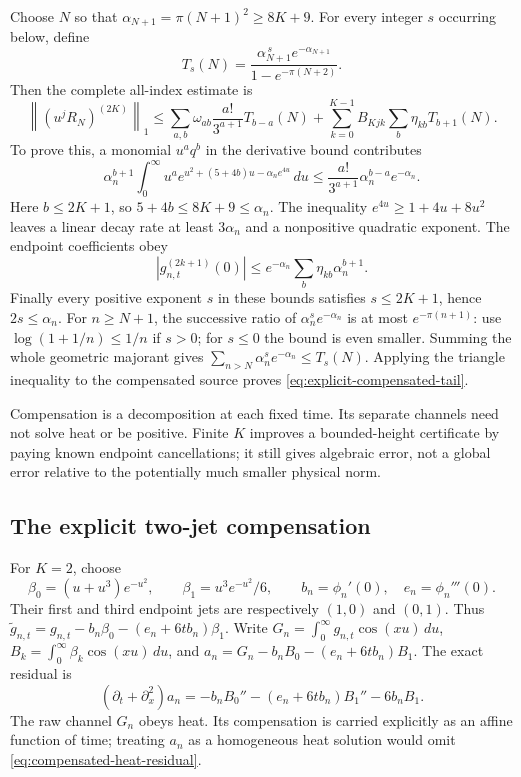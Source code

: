 \documentclass[11pt]{article}
\numberwithin{equation}{section}
\theoremstyle{definition}
\theoremstyle{remark}
\begin{document}
Choose \(N\) so that
\(\alpha_{N+1}=\pi(N+1)^2\geq8K+9\).
For every integer \(s\) occurring below, define
\[
 T_s(N)=
 \frac{\alpha_{N+1}^{\,s}e^{-\alpha_{N+1}}}
 {1-e^{-\pi(N+2)}}.
\]
Then the complete all-index estimate is
\begin{equation}
 \left\|(u^jR_N)^{(2K)}\right\|_1
 \leq
 \sum_{a,b}\omega_{ab}\frac{a!}{3^{a+1}}T_{b-a}(N)
 +\sum_{k=0}^{K-1}B_{Kjk}\sum_b\eta_{kb}T_{b+1}(N).
 \label{eq:explicit-compensated-tail}
\end{equation}
To prove this, a monomial \(u^aq^b\) in the derivative bound contributes
\[
 \alpha_n^{b+1}\int_0^\infty
 u^ae^{u^2+(5+4b)u-\alpha_ne^{4u}}\,du
 \leq \frac{a!}{3^{a+1}}\alpha_n^{b-a}e^{-\alpha_n}.
\]
Here \(b\leq2K+1\), so \(5+4b\leq8K+9\leq\alpha_n\).
The inequality \(e^{4u}\geq1+4u+8u^2\) leaves a linear decay rate
at least \(3\alpha_n\) and a nonpositive quadratic exponent.
The endpoint coefficients obey
\[
 |g_{n,t}^{(2k+1)}(0)|
 \leq e^{-\alpha_n}\sum_b\eta_{kb}\alpha_n^{b+1}.
\]
Finally every positive exponent \(s\) in these bounds satisfies
\(s\leq2K+1\), hence \(2s\leq\alpha_n\).
For \(n\geq N+1\), the successive ratio of
\(\alpha_n^se^{-\alpha_n}\) is at most \(e^{-\pi(n+1)}\):
use \(\log(1+1/n)\leq1/n\) if \(s>0\);
for \(s\leq0\) the bound is even smaller.
Summing the whole geometric majorant gives
\(\sum_{n>N}\alpha_n^se^{-\alpha_n}\leq T_s(N)\).
Applying the triangle inequality to the compensated source proves
\eqref{eq:explicit-compensated-tail}.

Compensation is a decomposition at each fixed time.  Its separate
channels need not solve heat or be positive.  Finite \(K\) improves a
bounded-height certificate by paying known endpoint cancellations;
it still gives algebraic error, not a global error relative to the
potentially much smaller physical norm.

\subsection{The explicit two-jet compensation}
\label{sec:explicit-two-jet}

For \(K=2\), choose
\[
 \beta_0=(u+u^3)e^{-u^2},\qquad \beta_1=u^3e^{-u^2}/6,
 \qquad b_n=\phi_n'(0),\quad e_n=\phi_n'''(0).
\]
Their first and third endpoint jets are respectively \((1,0)\) and
\((0,1)\). Thus
\(\widetilde g_{n,t}=g_{n,t}-b_n\beta_0-(e_n+6tb_n)\beta_1\).
Write \(G_n=\int_0^\infty g_{n,t}\cos(xu)\,du\),
\(B_k=\int_0^\infty\beta_k\cos(xu)\,du\), and
\(a_n=G_n-b_nB_0-(e_n+6tb_n)B_1\). The exact residual is
\begin{equation}
 (\partial_t+\partial_x^2)a_n
 =-b_nB_0''-(e_n+6tb_n)B_1''-6b_nB_1.
 \label{eq:compensated-heat-residual}
\end{equation}
The raw channel \(G_n\) obeys heat. Its compensation is carried
explicitly as an affine function of time; treating \(a_n\) as a
homogeneous heat solution would omit \eqref{eq:compensated-heat-residual}.
\end{document}
